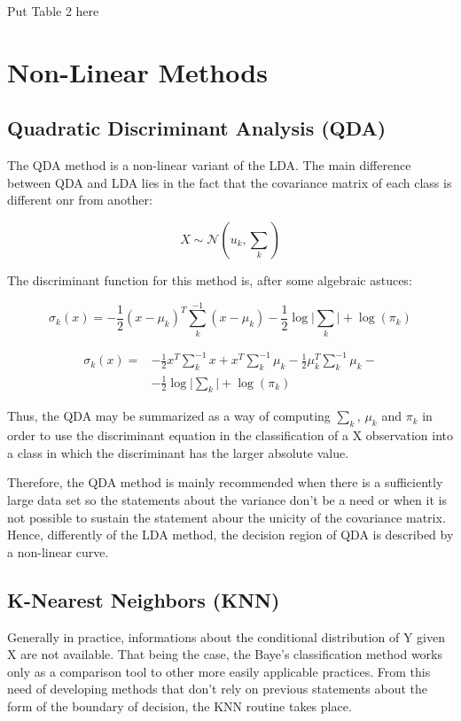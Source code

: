 \documentclass[conference]{IEEEtran}
\newcommand{\reviewUrgent}[1]{{\color{red} #1}} %
\begin{document}
\reviewUrgent{Put Table 2 here}


\section{Non-Linear Methods}

\subsection{Quadratic Discriminant Analysis (QDA)}

The QDA method is a non-linear variant of the LDA. The main difference between QDA and LDA
lies in the fact that the covariance matrix of each class is different onr from another:

\begin{equation}
    X \sim  \mathcal{N}(u_k, \textstyle \sum_k)\label{eq13}
\end{equation}

The discriminant function for this method is, after some algebraic astuces:

\begin{equation}
    \sigma_k(x) = -\frac{1}{2}(x-\mu_k)^T\sum^{-1}_k(x-\mu_k) - \frac{1}{2}\log \lvert\sum_k\rvert +\log(\pi_k) \label{eq14}
\end{equation}

\begin{equation}
\begin{aligned}
    \sigma_k(x) = {} 
    & -\frac{1}{2}x^T\sum^{-1}_kx + x^T\sum^{-1}_k\mu_k -  \frac{1}{2}\mu_k^T\sum^{-1}_k\mu_k - \\ 
    & - \frac{1}{2}\log \lvert\sum_k\rvert +\log(\pi_k) \label{eq15}
\end{aligned}
\end{equation}

Thus, the QDA may be summarized as a way of computing $\sum_k$, $\mu_k$ and $\pi_k$ 
in order to use the discriminant equation in the classification of a X observation into a class
in which the discriminant has the larger absolute value.  

Therefore, the QDA method is mainly recommended when there is a sufficiently large data set
so the statements about the variance don't be a need or when it is not possible to 
sustain the statement abour the unicity of the covariance matrix. Hence, differently 
of the LDA method, the decision region of QDA is described by a non-linear curve. 

\subsection{K-Nearest Neighbors (KNN)}
\label{KNN}
Generally in practice, informations about the conditional distribution of Y given X 
are not available. That being the case, the Baye's classification method works only as 
a comparison tool to other more easily applicable practices. From this need of developing 
methods that don't rely on previous statements about the form of the boundary of decision,
the KNN routine takes place.
\end{document}
